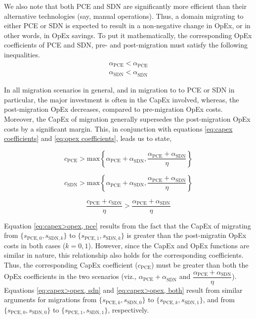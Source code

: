 \documentclass[smallextended]{svjour3}
\begin{document}
\par We also note that both PCE and SDN are significantly more efficient than
their alternative technologies (say, manual operations). Thus, a domain
migrating to either PCE or SDN is expected to result in a non-negative change in
OpEx, or in other words, in OpEx savings. To put it mathematically, the
corresponding OpEx coefficients of PCE and SDN, pre- and post-migration must
satisfy the following inequalities.
\begin{equation} \label{eq:unmig > mig}
\begin{array}{c}
\alpha_\textrm{PCE} < \alpha_{\overline{\textrm{PCE}}} \\
\alpha_\textrm{SDN} < \alpha_{\overline{\textrm{SDN}}}
\end{array}
\end{equation}

\par In all migration scenarios in general, and in migration to  to PCE or SDN
in particular, the major investment is often in the CapEx involved, whereas, the post-migration
OpEx decreases, compared to pre-migration OpEx costs. Moreover, the CapEx of
migration generally supersedes the post-migration OpEx costs by a significant margin.
This, in conjunction with equations \eqref{eq:capex coefficients} and
\eqref{eq:opex coefficients}, leads us to state,

\begin{equation} \label{eq:capex>opex, pce}
c_\textrm{PCE} > \textrm{max}\left\{\alpha_\textrm{PCE}+\alpha_{\overline{\textrm{SDN}}} , \dfrac{\alpha_\textrm{PCE}+\alpha_\textrm{SDN}}{\eta}\right\}
\end{equation}

\begin{equation} \label{eq:capex>opex, sdn}
c_\textrm{SDN} > \textrm{max}\left\{\alpha_{\overline{\textrm{PCE}}}+\alpha_\textrm{SDN} , \dfrac{\alpha_\textrm{PCE}+\alpha_\textrm{SDN}}{\eta}\right\}
\end{equation}

\begin{equation} \label{eq:capex>opex, both}
\dfrac{c_\textrm{PCE}+c_\textrm{SDN}}{\eta} > \dfrac{\alpha_\textrm{PCE}+\alpha_\textrm{SDN}}{\eta}
\end{equation}

Equation \eqref{eq:capex>opex, pce} results from the fact that the CapEx
of migrating from
$\{s_{\textrm{PCE},0},s_{\textrm{SDN},k}\}$
to $\{s_{\textrm{PCE},1},s_{\textrm{SDN},k}\}$ is greater than the
post-migratin OpEx costs in both cases ($k=0,1$). However, since the
CapEx and OpEx functions are similar in nature, this relationship also
holds for the corresponding coefficients. Thus, the corresponding CapEx
coefficient ($c_\textrm{PCE}$) must be greater than both the OpEx coefficients
in the two scenarios (viz.,
$\alpha_\textrm{PCE}+\alpha_{\overline{\textrm{SDN}}}$ and
$\dfrac{\alpha_\textrm{PCE}+\alpha_\textrm{SDN}}{\eta}$). Equations
\eqref{eq:capex>opex, sdn} and \eqref{eq:capex>opex, both} result from similar
arguments for migrations from
$\{s_{\textrm{PCE},k},s_{\textrm{SDN},0}\}$
to $\{s_{\textrm{PCE},k},s_{\textrm{SDN},1}\}$, and from
$\{s_{\textrm{PCE},0},s_{\textrm{SDN},0}\}$
to $\{s_{\textrm{PCE},1},s_{\textrm{SDN},1}\}$, respectively.
\end{document}
